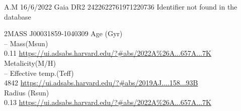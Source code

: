 A.M 16/6/2022
Gaia DR2 2422622761971220736 Identifier not found in the database

2MASS J00031859-1040309
Age (Gyr)\\
--
Mass(Msun)\\
0.11 \url{https://ui.adsabs.harvard.edu/?#abs/2022A%26A...657A...7K}\\
Metalicity(M/H)\\
--
Effective temp.(Teff)\\
4842 \url{https://ui.adsabs.harvard.edu/?#abs/2019AJ....158...93B}\\
Radius (Rsun)\\
0.13 \url{https://ui.adsabs.harvard.edu/?#abs/2022A%26A...657A...7K}\\
